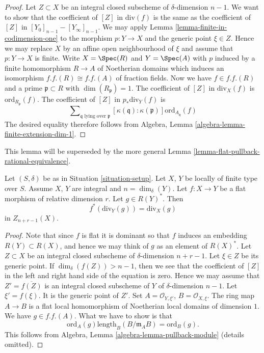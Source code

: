 \begin{proof}
\medskip\noindent
Let $Z \subset X$ be an integral closed subscheme of $\delta$-dimension
$n - 1$. We want to show that the coefficient of $[Z]$ in $\text{div}(f)$
is the same as the coefficient of $[Z]$ in
$[Y_0]_{n - 1} - [Y_\infty]_{n - 1}$.
We may apply Lemma \ref{lemma-finite-in-codimension-one}
to the morphism $p : Y \to X$ and
the generic point $\xi \in Z$. Hence we may replace $X$ by an
affine open neighbourhood of $\xi$ and assume that $p : Y \to X$ is finite.
Write $X = \Spec(R)$ and $Y = \Spec(A)$ with $p$ induced
by a finite homomorphism $R \to A$ of Noetherian domains which induces
an isomorphism $f.f.(R) \cong f.f.(A)$ of fraction fields.
Now we have $f \in f.f.(R)$ and a prime $\mathfrak p \subset R$
with $\dim(R_{\mathfrak p}) = 1$. The coefficient of
$[Z]$ in $\text{div}_X(f)$ is $\text{ord}_{R_\mathfrak p}(f)$.
The coefficient of $[Z]$ in $p_*\text{div}_Y(f)$ is
$$
\sum\nolimits_{\mathfrak q\text{ lying over }\mathfrak p}
[\kappa(\mathfrak q) : \kappa(\mathfrak p)]
\text{ord}_{A_{\mathfrak q}}(f)
$$
The desired equality therefore follows from
Algebra, Lemma \ref{algebra-lemma-finite-extension-dim-1}.
\end{proof}

\noindent
This lemma will be superseded by the more general
Lemma \ref{lemma-flat-pullback-rational-equivalence}.

\begin{lemma}
\label{lemma-flat-pullback-principal-divisor}
Let $(S, \delta)$ be as in Situation \ref{situation-setup}.
Let $X$, $Y$ be locally of finite type over $S$. Assume $X$, $Y$
are integral and $n = \dim_\delta(Y)$.
Let $f : X \to Y$ be a flat morphism of relative dimension $r$.
Let $g \in R(Y)^*$. Then
$$
f^*(\text{div}_Y(g)) = \text{div}_X(g)
$$
in $Z_{n + r - 1}(X)$.
\end{lemma}

\begin{proof}
Note that since $f$ is flat it is dominant so that
$f$ induces an embedding $R(Y) \subset R(X)$, and hence
we may think of $g$ as an element of $R(X)^*$.
Let $Z \subset X$ be an integral closed subscheme of
$\delta$-dimension $n + r - 1$. Let $\xi \in Z$
be its generic point. If $\dim_\delta(f(Z)) > n - 1$,
then we see that the coefficient of $[Z]$ in the left and
right hand side of the equation is zero.
Hence we may assume that $Z' = \overline{f(Z)}$ is an
integral closed subscheme of $Y$ of $\delta$-dimension $n - 1$.
Let $\xi' = f(\xi)$. It is the generic point of $Z'$.
Set $A = \mathcal{O}_{Y, \xi'}$, $B = \mathcal{O}_{X, \xi}$.
The ring map $A \to B$ is a flat local homomorphism of
Noetherian local domains of dimension $1$.
We have $g \in f.f.(A)$. What we have to show is that
$$
\text{ord}_A(g) \text{length}_B(B/\mathfrak m_AB)
=
\text{ord}_B(g).
$$
This follows from Algebra, Lemma \ref{algebra-lemma-pullback-module}
(details omitted).
\end{proof}











